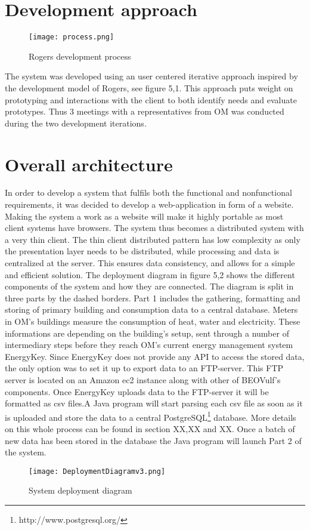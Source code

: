 \section{Development approach}
\begin{figure}
\texttt{[image: process.png]}
\caption{Rogers development process}
\end{figure}
The system was developed using an user centered iterative approach inspired by the development model of Rogers, see figure 5,1. This approach puts weight on prototyping and interactions with the client to both identify needs and evaluate prototypes. Thus 3 meetings with a representatives from OM was conducted during the two development iterations.
\section{Overall architecture}
In order to develop a system that fulfils both the functional and nonfunctional requirements, it was decided to develop a web-application in form of a website. Making the system a work as a website will make it highly portable as most client systems have browsers. The system thus becomes a distributed system with a very thin client. The thin client distributed pattern has low complexity as only the presentation layer needs to be distributed, while processing and data is centralized at the server. This ensures data consistency, and allows for a simple and efficient solution. The deployment diagram in figure 5,2 shows the different components of the system and how they are connected. The diagram is split in three parts by the dashed borders. 
Part 1 includes the gathering, formatting and storing of primary building and consumption data to a central database. Meters in OM’s buildings measure the consumption of heat, water and electricity. These informations are depending on the building’s setup, sent through a number of intermediary steps before they reach OM’s current energy management system EnergyKey. Since EnergyKey does not provide any API to access the stored data, the only option was to set it up to export data to an FTP-server. This FTP server is located on an Amazon ec2 instance along with other of BEOVulf’s components. Once EnergyKey uploads data to the FTP-server it will be formatted as csv files.A Java program will start parsing each csv file as soon as it is uploaded and store the data to a central PostgreSQL\footnote{http://www.postgresql.org/} database. More details on this whole process can be found in section XX,XX and XX. Once a batch of new data has been stored in the database the Java program will launch Part 2 of the system.
\begin{figure}
\texttt{[image: DeploymentDiagramv3.png]}
\caption{System deployment diagram}
\end{figure}

